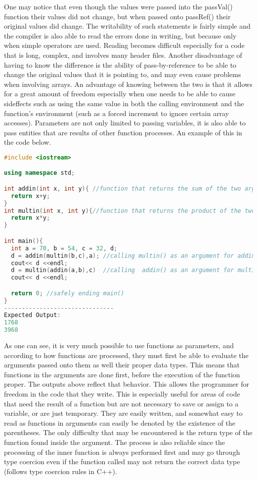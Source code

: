 \documentclass[12pt]{article}
\begin{document}
One may notice that even though the values were passed into the passVal() function their values did not change, but when passed onto passRef() their original values did change. The writability of such statements is fairly simple and the compiler is also able to read the errors done in writing, but because only when simple operators are used. Reading becomes difficult especially for a code that is long, complex, and involves many header files. Another disadvantage of having to know the difference is the ability of pass-by-reference to be able to change the original values that it is pointing to, and may even cause problems when involving arrays. An advantage of knowing between the two is that it allows for a great amount of freedom especially when one needs to be able to cause sideffects such as using the same value in both the calling environment and the function's environment (such as a forced increment to ignore certain array accesses). Parameters are not only limited to passing variables, it is also able to pass entities that are results of other function processes. An example of this in the code below.
\begin{lstlisting}[language=C++]
#include <iostream>

using namespace std;

int addin(int x, int y){ //function that returns the sum of the two arguments
  return x+y;
}
int multin(int x, int y){//function that returns the product of the two arguments
  return x*y;
}

int main(){
  int a = 70, b = 54, c = 32, d;
  d = addin(multin(b,c),a); //calling multin() as an argument for addin()
  cout<< d <<endl;
  d = multin(addin(a,b),c)  //calling  addin() as an argument for multin() 
  cout<< d <<endl;

  return 0; //safely ending main()
}
-------------------------------
Expected Output:
1768
3968
\end{lstlisting}
As one can see, it is very much possible to use functions as parameters, and according to how functions are processed, they must first be able to evaluate the arguments passed onto them as well their proper data types. This means that functions in the arguments are done first, before the execution of the function proper. The outputs above reflect that behavior. This allows the programmer for freedom in the code that they write. This is especially useful for areas of code that need the result of a function but are not necessary to save or assign to a variable, or are just temporary. They are easily written, and somewhat easy to read as functions in arguments can easily be denoted by the existence of the parentheses. The only difficulty that may be encountered is the return type of the function found inside the argument. The process is also reliable since the processing of the inner function is always performed first and may go through type coercion even if the function called may not return the correct data type (follows type coercion rules in C++). 
\end{document}
